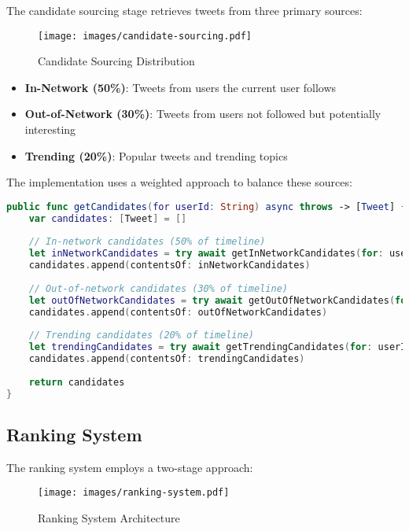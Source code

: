 \documentclass[11pt,a4paper]{article}
\begin{document}
The candidate sourcing stage retrieves tweets from three primary sources:

\begin{figure}[H]
    \centering
    \texttt{[image: images/candidate-sourcing.pdf]}
    \caption{Candidate Sourcing Distribution}
    \label{fig:candidate-sourcing}
\end{figure}

\begin{itemize}
    \item \textbf{In-Network (50\%)}: Tweets from users the current user follows
    \item \textbf{Out-of-Network (30\%)}: Tweets from users not followed but potentially interesting
    \item \textbf{Trending (20\%)}: Popular tweets and trending topics
\end{itemize}

The implementation uses a weighted approach to balance these sources:

\begin{lstlisting}[language=Swift, caption=Candidate Sourcing Implementation]
public func getCandidates(for userId: String) async throws -> [Tweet] {
    var candidates: [Tweet] = []
    
    // In-network candidates (50% of timeline)
    let inNetworkCandidates = try await getInNetworkCandidates(for: userId)
    candidates.append(contentsOf: inNetworkCandidates)
    
    // Out-of-network candidates (30% of timeline)
    let outOfNetworkCandidates = try await getOutOfNetworkCandidates(for: userId)
    candidates.append(contentsOf: outOfNetworkCandidates)
    
    // Trending candidates (20% of timeline)
    let trendingCandidates = try await getTrendingCandidates(for: userId)
    candidates.append(contentsOf: trendingCandidates)
    
    return candidates
}
\end{lstlisting}

\subsection{Ranking System}

The ranking system employs a two-stage approach:

\begin{figure}[H]
    \centering
    \texttt{[image: images/ranking-system.pdf]}
    \caption{Ranking System Architecture}
    \label{fig:ranking-system}
\end{figure}
\end{document}
